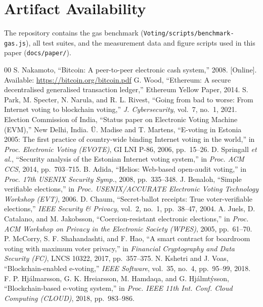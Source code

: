 \documentclass[conference]{IEEEtran}
\newcommand{\code}[1]{\texttt{\small #1}}
\begin{document}
\section*{Artifact Availability}
The repository contains the gas benchmark (\code{Voting/scripts/benchmark-gas.js}), all test suites, and the measurement data and figure scripts used in this paper (\code{docs/paper/}).

\begin{thebibliography}{00}
 S. Nakamoto, ``Bitcoin: A peer-to-peer electronic cash system,'' 2008. [Online]. Available: \url{https://bitcoin.org/bitcoin.pdf}
 G. Wood, ``Ethereum: A secure decentralised generalised transaction ledger,'' Ethereum Yellow Paper, 2014.
 S. Park, M. Specter, N. Narula, and R. L. Rivest, ``Going from bad to worse: From Internet voting to blockchain voting,'' \emph{J. Cybersecurity}, vol.~7, no.~1, 2021.
 Election Commission of India, ``Status paper on Electronic Voting Machine (EVM),'' New Delhi, India.
 \"U. Madise and T. Martens, ``E-voting in Estonia 2005: The first practice of country-wide binding Internet voting in the world,'' in \emph{Proc. Electronic Voting (EVOTE)}, GI LNI P-86, 2006, pp.~15--26.
 D. Springall \emph{et al.}, ``Security analysis of the Estonian Internet voting system,'' in \emph{Proc. ACM CCS}, 2014, pp.~703--715.
 B. Adida, ``Helios: Web-based open-audit voting,'' in \emph{Proc. 17th USENIX Security Symp.}, 2008, pp.~335--348.
 J. Benaloh, ``Simple verifiable elections,'' in \emph{Proc. USENIX/ACCURATE Electronic Voting Technology Workshop (EVT)}, 2006.
 D. Chaum, ``Secret-ballot receipts: True voter-verifiable elections,'' \emph{IEEE Security \& Privacy}, vol.~2, no.~1, pp.~38--47, 2004.
 A. Juels, D. Catalano, and M. Jakobsson, ``Coercion-resistant electronic elections,'' in \emph{Proc. ACM Workshop on Privacy in the Electronic Society (WPES)}, 2005, pp.~61--70.
 P. McCorry, S. F. Shahandashti, and F. Hao, ``A smart contract for boardroom voting with maximum voter privacy,'' in \emph{Financial Cryptography and Data Security (FC)}, LNCS 10322, 2017, pp.~357--375.
 N. Kshetri and J. Voas, ``Blockchain-enabled e-voting,'' \emph{IEEE Software}, vol.~35, no.~4, pp.~95--99, 2018.
 F. P. Hj\'{a}lmarsson, G. K. Hrei\dh arsson, M. Hamdaqa, and G. Hj\'{a}lmt\'{y}sson, ``Blockchain-based e-voting system,'' in \emph{Proc. IEEE 11th Int. Conf. Cloud Computing (CLOUD)}, 2018, pp.~983--986.

\end{thebibliography}
\end{document}
